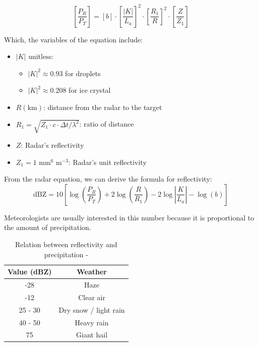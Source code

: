 \[
    \left[ \frac{P_R}{P_T} \right]=\left[ b \right]\cdot\left[ \frac{|K|}{L_a} \right]^2\cdot\left[ \frac{R_1}{R} \right]^2\cdot\left[ \frac{Z}{Z_1} \right]
\]
\vspace{0.5cm}

Which, the variables of the equation include:
\begin{itemize}
    \item $|K|$ unitless:
          \begin{itemize}
              \item $|K|^2 \approx 0.93$ for droplets
              \item $|K|^2 \approx 0.208$ for ice crystal
          \end{itemize}
    \item $R (\text{km})$: distance from the radar to the target
    \item $R_1 = \sqrt{Z_1 \cdot c \cdot \Delta t / \lambda^2}$: ratio of distance
    \item $Z$: Radar's reflectivity
    \item $Z_1 = 1 \text{ mm}^6 \text{ m}^{-3}$: Radar's unit reflectivity
\end{itemize}

From the radar equation, we can derive the formula for reflectivity:
\vspace{0.5cm}
\[
    \text{dBZ} = 10\left[ \log\left( \frac{P_R}{P_T} \right) + 2 \log\left( \frac{R}{R_1} \right) - 2\log\left| \frac{K}{L_a} \right| - \log\left( b \right) \right]
\]
\vspace{0.5cm}

Meteorologists are usually interested in this number because it is proportional to the amount of precipitation.
\vspace{0.5cm}

\begin{table}[h]
    \centering
    \begin{tabular}{|c|c|}
        \hline
        Value (dBZ) & Weather               \\
        \hline
        -28         & Haze                  \\
        -12         & Clear air             \\
        25 - 30     & Dry snow / light rain \\
        40 - 50     & Heavy rain            \\
        75          & Giant hail            \\
        \hline
    \end{tabular}
    \vspace{1em}
    \caption{ Relation between reflectivity and precipitation - \citet{2022Weather}}
\end{table}

